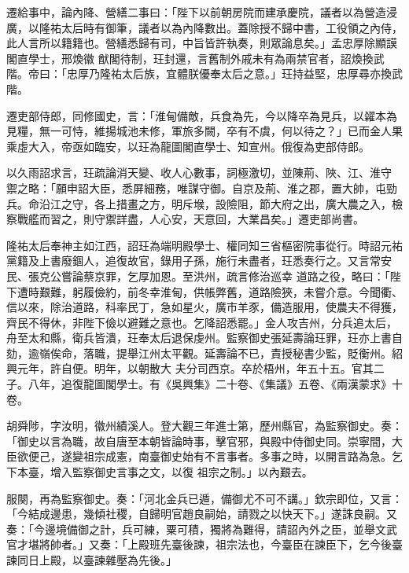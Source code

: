 \begin{pinyinscope}
 遷給事中，論內降、營繕二事曰：「陛下以前朝房院而建承慶院，議者以為營造浸廣，以隆祐太后時有御筆，議者以為內降數出。蓋除授不歸中書，工役領之內侍，此人言所以籍籍也。營繕悉歸有司，中旨皆許執奏，則眾論息矣。」孟忠厚除顯謨閣直學士，邢煥徽
 猷閣待制，玨封還，言舊制外戚未有為兩禁官者，詔煥換武階。帝曰：「忠厚乃隆祐太后族，宜體朕優奉太后之意。」玨持益堅，忠厚尋亦換武階。



 遷吏部侍郎，同修國史，言：「淮甸備敵，兵食為先，今以降卒為見兵，以糴本為見糧，無一可恃，維揚城池未修，軍旅多闕，卒有不虞，何以待之？」已而金人果乘虛大入，帝亟如臨安，以玨為龍圖閣直學士、知宣州。俄復為吏部侍郎。



 以久雨詔求言，玨疏論消天變、收人心數事，詞極激切，並陳荊、陜、江、淮守
 禦之略：「願申詔大臣，悉屏細務，唯謀守御。自京及荊、淮之郡，置大帥，屯勁兵。命沿江之守，各上措畫之方，明斥堠，設險阻，節大府之出，廣大農之入，檢察戰艦而習之，則守禦詳盡，人心安，天意回，大業昌矣。」遷吏部尚書。



 隆祐太后奉神主如江西，詔玨為端明殿學士、權同知三省樞密院事從行。時詔元祐黨籍及上書廢錮人，追復故官，錄用子孫，施行未盡者，玨悉奏行之。又言常安民、張克公嘗論蔡京罪，乞厚加恩。至洪州，疏言修治巡幸
 道路之役，略曰：「陛下遭時艱難，躬履儉約，前冬幸淮甸，供帳弊舊，道路險狹，未嘗介意。今聞衢、信以來，除治道路，科率民丁，急如星火，廣市羊豕，備造服用，使農夫不得獲，齊民不得休，非陛下儉以避難之意也。乞降詔悉罷。」金人攻吉州，分兵追太后，舟至太和縣，衛兵皆潰，玨奉太后退保虔州。監察御史張延壽論玨罪，玨亦上書自劾，逾嶺俟命，落職，提舉江州太平觀。延壽論不已，責授秘書少監，貶衡州。紹興元年，許自便。明年，以朝散大
 夫分司西京。卒於梧州，年五十五。官其二子。八年，追復龍圖閣學士。有《吳興集》二十卷、《集議》五卷、《兩漢蒙求》十卷。



 胡舜陟，字汝明，徽州績溪人。登大觀三年進士第，歷州縣官，為監察御史。奏：「御史以言為職，故自唐至本朝皆論時事，擊官邪，與殿中侍御史同。崇寧間，大臣欲便己，遂變祖宗成憲，南臺御史始有不言事者。多事之時，以開言路為急。乞下本臺，增入監察御史言事之文，以復
 祖宗之制。」以內艱去。



 服闋，再為監察御史。奏：「河北金兵已遁，備御尤不可不講。」欽宗即位，又言：「今結成邊患，幾傾社稷，自歸明官趙良嗣始，請戮之以快天下。」遂誅良嗣。又奏：「今邊境備御之計，兵可練，粟可積，獨將為難得，請詔內外之臣，並舉文武官才堪將帥者。」又奏：「上殿班先臺後諫，祖宗法也，今臺臣在諫臣下，乞今後臺諫同日上殿，以臺諫雜壓為先後。」




\end{pinyinscope}
